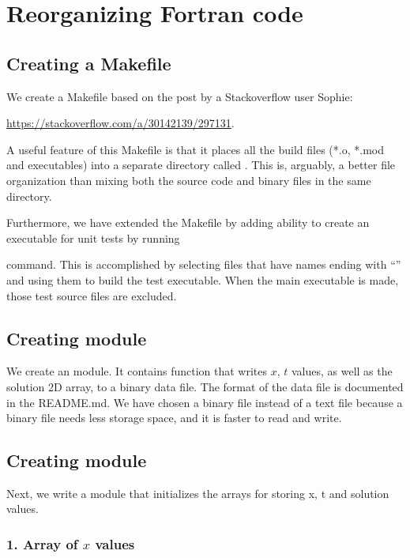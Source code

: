 \section{Reorganizing Fortran code}


\subsection{Creating a Makefile}

We create a Makefile based on the post by a Stackoverflow user Sophie:

\url{https://stackoverflow.com/a/30142139/297131}.

A useful feature of this Makefile is that it places all the build files (*.o, *.mod and executables) into a separate directory called . This is, arguably, a better file organization than mixing both the source code and binary  files in the same directory.

Furthermore, we have extended the Makefile by adding ability to create an executable for unit tests by running


command. This is accomplished by selecting files that have names ending with ``'' and using them to build the test executable. When the main executable is made, those test source files are excluded.


\subsection{Creating  module}

We create an  module. It contains  function that writes $x$, $t$ values, as well as the solution 2D array, to a binary data file. The format of the data file is documented in the README.md. We have chosen a binary file instead of a text file because a binary file needs less storage space, and it is faster to read and write.


\subsection{Creating  module}

Next, we write a   module that initializes the arrays for storing x, t and solution values.


\subsubsection*{1. Array of $x$ values}

